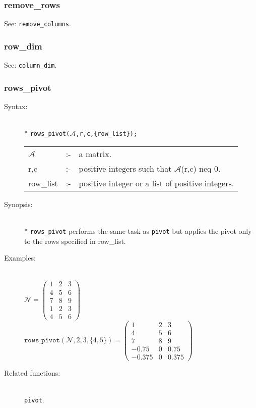 \subsubsection{remove\_rows}
\label{linalg:remove_rows}
See: \texttt{remove\_columns}.


\subsubsection{row\_dim}
\label{linalg:row_dim}

See: \texttt{column\_dim}.


\subsubsection{rows\_pivot}
\label{linalg:rows_pivot}

\begin{description}
\item[Syntax:]\mbox{}\\*
\texttt{rows\_pivot($\mathcal{A}$,r,c,\{row\_list\});}\\[2mm]
\begin{tabular}{l l l}
$\mathcal{A}$ &:-& a matrix. \\
r,c        &:-& positive integers such that $\mathcal{A}$(r,c) neq 0.\\
row\_list  &:-& positive integer or a list of positive integers.
\end{tabular}

\item[Synopsis:]\mbox{}\\*
\texttt{rows\_pivot} performs the same task as \texttt{pivot} but applies
the pivot only to the rows specified in row\_list.

\item[Examples:]\mbox{}\\
  \(\mathcal{N} = \begin{pmatrix} 1 & 2 & 3 \\ 4 & 5 & 6 \\ 7 & 8 &
    9 \\1 & 2 & 3 \\ 4 & 5 & 6 \end{pmatrix}\) \\[2mm]
  \(\texttt{rows\_pivot}(\mathcal{N},2,3,\{4,5\}) = \begin{pmatrix}
    1 & 2 & 3 \\ 4 & 5 & 6 \\ 7 & 8 & 9 \\ -0.75 & 0 & 0.75 \\
    -0.375 & 0 & 0.375
  \end{pmatrix}\)

\item[Related functions:]\mbox{}\\
\texttt{pivot}.
\end{description}


